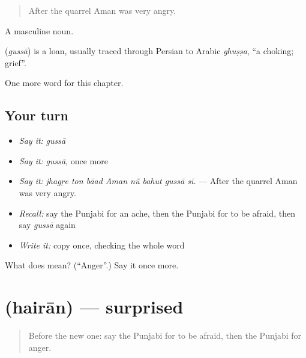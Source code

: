 \begin{quote}
After the quarrel Aman was very angry.
\end{quote}

A masculine noun.

\begin{cousinweb}
\textbf{} (\emph{gussā}) is a loan, usually traced through Persian to Arabic \emph{ghuṣṣa}, \textquotedblleft{}a choking; grief\textquotedblright{}.
\end{cousinweb}

\begin{grammarlens}[title={What you've built}]
One more word for this chapter.
\end{grammarlens}

\subsection*{Your turn}
\begin{itemize}
\raggedright
  \item \emph{Say it:} \emph{gussā}
  \item \emph{Say it:} \emph{gussā}, once more
  \item \emph{Say it:} \emph{jhagṛe ton bāad Aman nū̃ bahut gussā sī.} — After the quarrel Aman was very angry.
  \item \emph{Recall:} say the Punjabi for an ache, then the Punjabi for to be afraid, then say \emph{gussā} again
  \item \emph{Write it:} copy \textbf{} once, checking the whole word
\end{itemize}

\begin{tcolorbox}[breakable,colback=teal!4,colframe=teal!35!black,title={Before you move on}]
What does  mean? (\textquotedblleft{}Anger\textquotedblright{}.) Say it once more.
\end{tcolorbox}
\section[\texorpdfstring{\pa{ਹੈਰਾਨ} (hairān)}{ਹੈਰਾਨ (hairān)}]{ (hairān) — surprised}

\label{lesson:PA-C326-hairan}



\begin{quote}
Before the new one: say the Punjabi for to be afraid, then the Punjabi for anger.
\end{quote}

